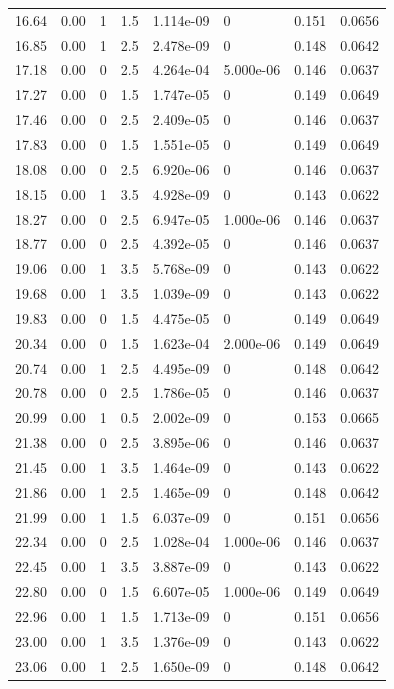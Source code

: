 \documentclass[preview]{standalone}
\begin{document}
{{{\begin{tabular}{L{1.2cm}C{1.2cm} C{0.3cm}C{0.5cm} C{1.4cm}C{1.4cm} C{1.4cm}C{1.4cm}}
  16.64  &  0.00  & 1     & 1.5 &  1.114e-09  & 0  & 0.151 &  0.0656   \\ 
  16.85  &  0.00  & 1     & 2.5 &  2.478e-09  & 0  & 0.148 &  0.0642   \\ 
  17.18  &  0.00  & 0     & 2.5 &  4.264e-04  & 5.000e-06  & 0.146 &  0.0637   \\ 
  17.27  &  0.00  & 0     & 1.5 &  1.747e-05  & 0  & 0.149 &  0.0649   \\ 
  17.46  &  0.00  & 0     & 2.5 &  2.409e-05  & 0  & 0.146 &  0.0637   \\ 
  17.83  &  0.00  & 0     & 1.5 &  1.551e-05  & 0  & 0.149 &  0.0649   \\ 
  18.08  &  0.00  & 0     & 2.5 &  6.920e-06  & 0  & 0.146 &  0.0637   \\ 
  18.15  &  0.00  & 1     & 3.5 &  4.928e-09  & 0  & 0.143 &  0.0622   \\ 
  18.27  &  0.00  & 0     & 2.5 &  6.947e-05  & 1.000e-06  & 0.146 &  0.0637   \\ 
  18.77  &  0.00  & 0     & 2.5 &  4.392e-05  & 0  & 0.146 &  0.0637   \\ 
  19.06  &  0.00  & 1     & 3.5 &  5.768e-09  & 0  & 0.143 &  0.0622   \\ 
  19.68  &  0.00  & 1     & 3.5 &  1.039e-09  & 0  & 0.143 &  0.0622   \\ 
  19.83  &  0.00  & 0     & 1.5 &  4.475e-05  & 0  & 0.149 &  0.0649   \\ 
  20.34  &  0.00  & 0     & 1.5 &  1.623e-04  & 2.000e-06  & 0.149 &  0.0649   \\ 
  20.74  &  0.00  & 1     & 2.5 &  4.495e-09  & 0  & 0.148 &  0.0642   \\ 
  20.78  &  0.00  & 0     & 2.5 &  1.786e-05  & 0  & 0.146 &  0.0637   \\ 
  20.99  &  0.00  & 1     & 0.5 &  2.002e-09  & 0  & 0.153 &  0.0665   \\ 
  21.38  &  0.00  & 0     & 2.5 &  3.895e-06  & 0  & 0.146 &  0.0637   \\ 
  21.45  &  0.00  & 1     & 3.5 &  1.464e-09  & 0  & 0.143 &  0.0622   \\ 
  21.86  &  0.00  & 1     & 2.5 &  1.465e-09  & 0  & 0.148 &  0.0642   \\ 
  21.99  &  0.00  & 1     & 1.5 &  6.037e-09  & 0  & 0.151 &  0.0656   \\ 
  22.34  &  0.00  & 0     & 2.5 &  1.028e-04  & 1.000e-06  & 0.146 &  0.0637   \\ 
  22.45  &  0.00  & 1     & 3.5 &  3.887e-09  & 0  & 0.143 &  0.0622   \\ 
  22.80  &  0.00  & 0     & 1.5 &  6.607e-05  & 1.000e-06  & 0.149 &  0.0649   \\ 
  22.96  &  0.00  & 1     & 1.5 &  1.713e-09  & 0  & 0.151 &  0.0656   \\ 
  23.00  &  0.00  & 1     & 3.5 &  1.376e-09  & 0  & 0.143 &  0.0622   \\ 
  23.06  &  0.00  & 1     & 2.5 &  1.650e-09  & 0  & 0.148 &  0.0642   \\ 
\hline 
\end{tabular} 

}}}
\end{document}
